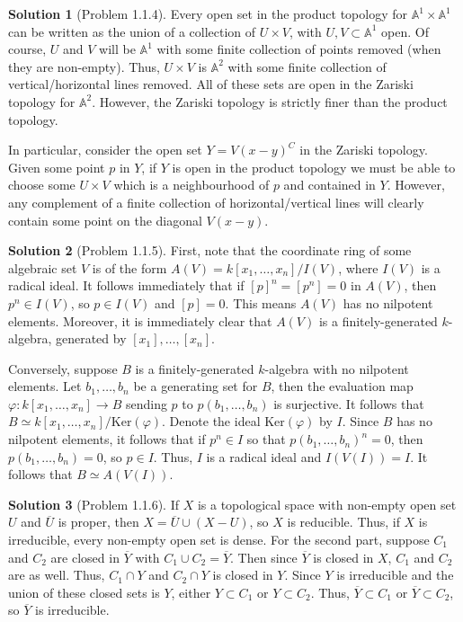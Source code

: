 \documentclass[aps,pra,showpacs,notitlepage,onecolumn,superscriptaddress,nofootinbib]{revtex4-1}
\theoremstyle{definition}
\newtheorem{solution}{Solution}[section]
\begin{document}
\begin{solution}[Problem 1.1.4]
  Every open set in the product topology for $\mathbb{A}^1 \times \mathbb{A}^1$ can be written as the union of a collection of $U \times V$, with $U, V \subset \mathbb{A}^1$ open. Of course, $U$ and $V$
  will be $\mathbb{A}^1$ with some finite collection of points removed (when they are non-empty). Thus, $U \times V$ is $\mathbb{A}^2$ with some finite collection of vertical/horizontal lines removed.
  All of these sets are open in the Zariski topology for $\mathbb{A}^2$. However, the Zariski topology is strictly finer than the product topology.

  In particular, consider the open set $Y = V(x - y)^{C}$ in the Zariski topology. Given some point $p$ in $Y$, if $Y$ is open in the product topology we must be able to choose some $U \times V$
  which is a neighbourhood of $p$ and contained in $Y$. However, any complement of a finite collection of horizontal/vertical lines will clearly contain some point on the diagonal $V(x - y)$.
  \end{solution}

\begin{solution}[Problem 1.1.5]
  First, note that the coordinate ring of some algebraic set $V$ is of the form $A(V) = k[x_1, \dots, x_n]/I(V)$, where $I(V)$ is a radical ideal. It follows immediately that if $[p]^n = [p^n] = 0$ in $A(V)$,
  then $p^n \in I(V)$, so $p \in I(V)$ and $[p] = 0$. This means $A(V)$ has no nilpotent elements. Moreover, it is immediately clear that $A(V)$ is a finitely-generated $k$-algebra, generated by $[x_1], \dots, [x_n]$.

  Conversely, suppose $B$ is a finitely-generated $k$-algebra with no nilpotent elements. Let $b_1, \dots, b_n$ be a generating set for $B$, then the evaluation map $\varphi : k[x_1, \dots, x_n] \rightarrow B$
  sending $p$ to $p(b_1, \dots, b_n)$ is surjective. It follows that $B \simeq k[x_1, \dots, x_n]/\text{Ker}(\varphi)$. Denote the ideal $\text{Ker}(\varphi)$ by $I$. Since $B$ has no nilpotent elements, it follows
  that if $p^n \in I$ so that $p(b_1, \dots, b_n)^n = 0$, then $p(b_1, \dots, b_n) = 0$, so $p \in I$. Thus, $I$ is a radical ideal and $I(V(I)) = I$. It follows that $B \simeq A(V(I))$.
  \end{solution}

\begin{solution}[Problem 1.1.6]
If $X$ is a topological space with non-empty open set $U$ and $\overline{U}$ is proper, then $X = \overline{U} \cup (X - U)$, so $X$ is reducible. Thus, if $X$ is irreducible, every non-empty open
set is dense. For the second part, suppose $C_1$ and $C_2$ are closed in $\overline{Y}$ with $C_1 \cup C_2 = \overline{Y}$. Then since $\overline{Y}$ is closed in $X$, $C_1$ and $C_2$ are as well. Thus,
$C_1 \cap Y$ and $C_2 \cap Y$ is closed in $Y$. Since $Y$ is irreducible and the union of these closed sets is $Y$, either $Y \subset C_1$ or $Y \subset C_2$. Thus, $\overline{Y} \subset C_1$ or $\overline{Y} \subset C_2$,
so $\overline{Y}$ is irreducible.
  \end{solution}
\end{document}

